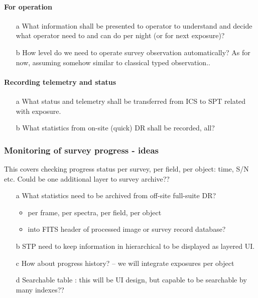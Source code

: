 \documentclass[a4paper,notitlepage]{article}
\begin{document}
\paragraph{For operation}

\begin{enumerate}
  \item[a] What information shall be presented to operator to understand and 
    decide what operator need to and can do per night (or for next exposure)?
  \item[b] How level do we need to operate survey observation automatically?
    As for now, assuming somehow similar to classical typed observation..
\end{enumerate}

\paragraph{Recording telemetry and status}

\begin{enumerate}
  \item[a] What status and telemetry shall be transferred from ICS to SPT 
    related with exposure.
  \item[b] What statistics from on-site (quick) DR shall be recorded, all?
\end{enumerate}

\subsubsection{Monitoring of survey progress - ideas}

This covers checking progress status per survey, per field, per object: 
time, S/N etc. Could be one additional layer to survey archive??

\begin{enumerate}
  \item[a] What statistics need to be archived from off-site full-suite DR?
    \begin{itemize}
      \item per frame, per spectra, per field, per object
      \item into FITS header of processed image or survey record database?
    \end{itemize}
  \item[b] STP need to keep information in hierarchical to be displayed as layered UI.
  \item[c] How about progress history? -- we will integrate exposures per object
  \item[d] Searchable table : this will be UI design, but capable to be searchable 
    by many indexes??
\end{enumerate}
\end{document}
